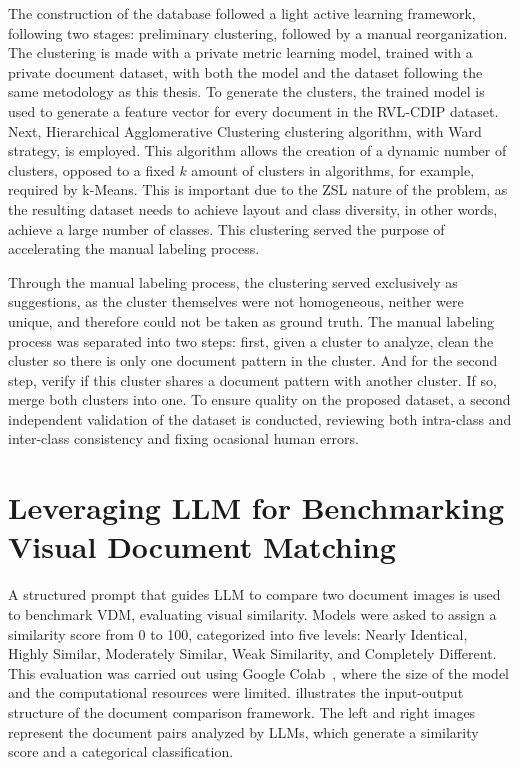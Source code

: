 The construction of the database followed a light active learning framework, following two stages: preliminary clustering, followed by a manual reorganization. The clustering is made with a private metric learning model, trained with a private document dataset, with both the model and the dataset following the same metodology as this thesis. To generate the clusters, the trained model is used to generate a feature vector for every document in the \gls{RVL-CDIP} dataset. Next, Hierarchical Agglomerative Clustering clustering algorithm, with Ward\cite{ward1963} strategy, is employed. This algorithm allows the creation of a dynamic number of clusters, opposed to a fixed $k$ amount of clusters in algorithms, for example, required by k-Means. This is important due to the \gls{ZSL} nature of the problem, as the resulting dataset needs to achieve layout and class diversity, in other words, achieve a large number of classes. This clustering served the purpose of accelerating the manual labeling process.

Through the manual labeling process, the clustering served exclusively as suggestions, as the cluster themselves were not homogeneous, neither were unique, and therefore could not be taken as ground truth. The manual labeling process was separated into two steps: first, given a cluster to analyze, clean the cluster so there is only one document pattern in the cluster. And for the second step, verify if this cluster shares a document pattern with another cluster. If so, merge both clusters into one. To ensure quality on the proposed dataset, a second independent validation of the dataset is conducted, reviewing both intra-class and inter-class consistency and fixing ocasional human errors.

\section{Leveraging LLM for Benchmarking Visual Document Matching}
\label{sec:method_benchmark}

A structured prompt that guides \gls{LLM} to compare two document images is used to benchmark \gls{VDM}, evaluating visual similarity. Models were asked to assign a similarity score from 0 to 100, categorized into five levels: Nearly Identical, Highly Similar, Moderately Similar, Weak Similarity, and Completely Different. This evaluation was carried out using Google Colab~\cite{googlecolab}, where the size of the model and the computational resources were limited.  illustrates the input-output structure of the document comparison framework. The left and right images represent the document pairs analyzed by \glspl{LLM}, which generate a similarity score and a categorical classification.

